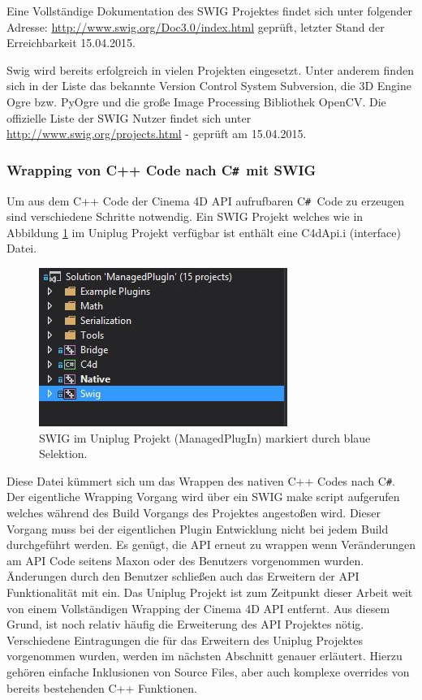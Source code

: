 \documentclass[pagesize, paper=a4, fontsize=12pt, titlepage=true, headings=small, headnosepline, abstractoff, liststotoc, nochapterprefix, plainheadsepline, twoside]{scrreprt}
\newcommand{\CS}{C\texttt{\#}}
\newcommand{\CSS}{C\texttt{\# }}
\begin{document}
Eine Vollständige Dokumentation des SWIG Projektes findet sich unter folgender Adresse: \url{http://www.swig.org/Doc3.0/index.html} geprüft, letzter Stand der Erreichbarkeit 15.04.2015.

Swig wird bereits erfolgreich in vielen Projekten eingesetzt. Unter anderem finden sich in der Liste das bekannte Version Control System Subversion, die 3D Engine Ogre bzw. PyOgre und die große Image Processing Bibliothek OpenCV. Die offizielle Liste der SWIG Nutzer findet sich unter \url{http://www.swig.org/projects.html} - geprüft am 15.04.2015.

\subsubsection{Wrapping von C++ Code nach \CSS mit SWIG}


Um aus dem C++ Code der Cinema 4D API aufrufbaren \CSS Code zu erzeugen sind verschiedene Schritte notwendig. Ein SWIG Projekt welches wie in Abbildung \ref{SWIGUniplug} im Uniplug Projekt verfügbar ist enthält eine C4dApi.i (interface) Datei.

\begin{figure}[ht]
	\centering
	\includegraphics[width=\linewidth/2]{Bilder/ProjektstrukturSwig.JPG}
	\caption{SWIG im Uniplug Projekt (ManagedPlugIn) markiert durch blaue Selektion.}
	\label{SWIGUniplug}
\end{figure}

Diese Datei kümmert sich um das Wrappen des nativen C++ Codes nach \CS. Der eigentliche Wrapping Vorgang wird über ein SWIG make script aufgerufen welches während des Build Vorgangs des Projektes angestoßen wird. Dieser Vorgang muss bei der eigentlichen Plugin Entwicklung nicht bei jedem Build durchgeführt werden. Es genügt, die API erneut zu wrappen wenn Veränderungen am API Code seitens Maxon oder des Benutzers vorgenommen wurden. Änderungen durch den Benutzer schließen auch das Erweitern der API Funktionalität mit ein. Das Uniplug Projekt ist zum Zeitpunkt dieser Arbeit weit von einem Vollständigen Wrapping der Cinema 4D API entfernt. Aus diesem Grund, ist noch relativ häufig die Erweiterung des API Projektes nötig. Verschiedene Eintragungen die für das Erweitern des Uniplug Projektes vorgenommen wurden, werden im nächsten Abschnitt genauer erläutert. Hierzu gehören einfache Inklusionen von Source Files, aber auch komplexe overrides von bereits bestehenden C++ Funktionen.
\end{document}
